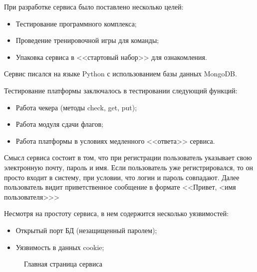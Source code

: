 При разработке сервиса было поставлено несколько целей:
\begin{itemize} 
\item Тестирование программного комплекса;
\item Проведение тренировочной игры для команды;
\item Упаковка сервиса в <<стартовый набор>> для ознакомления.
\end{itemize}

Сервис писался на языке Python с использованием базы данных MongoDB.

Тестирование платформы заключалось в тестировании следующий функций:
\begin{itemize} 
\item Работа чекера (методы check, get, put);
\item Работа модуля сдачи флагов;
\item Работа платформы в условиях медленного <<ответа>> сервиса.
\end{itemize}

Смысл сервиса состоит в том, что при регистрации пользователь указывает свою электронную почту, пароль и имя.
Если пользователь уже регистрировался, то он просто входит в систему, при условии, что логин и пароль  совпадают. Далее пользователь видит приветственное сообщение в формате <<Привет, <имя пользователя>>>

Несмотря на простоту сервиса, в нем содержится несколько уязвимостей:
\begin{itemize} 
\item Открытый порт БД (незащищенный паролем);
\item Уязвимость в данных cookie;
\end{itemize}

\begin{figure}[ht!]
\caption{Главная страница сервиса}
\end{figure} 
